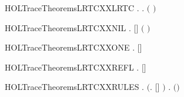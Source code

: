 \newcommand{\HOLTraceTheoremsLRTCXXINDUCT}{\UseVerbatim{HOLTraceTheoremsLRTCXXINDUCT}}
\begin{SaveVerbatim}{HOLTraceTheoremsLRTCXXLRTC}
\HOLTokenTurnstile{} \HOLSymConst{\HOLTokenForall{}}   .
            \HOLSymConst{\HOLTokenImp{}} \HOLSymConst{\HOLTokenForall{}} .      \HOLSymConst{\HOLTokenImp{}}    \ensuremath{(} \HOLSymConst{++} \ensuremath{)} 
\end{SaveVerbatim}
\newcommand{\HOLTraceTheoremsLRTCXXLRTC}{\UseVerbatim{HOLTraceTheoremsLRTCXXLRTC}}
\begin{SaveVerbatim}{HOLTraceTheoremsLRTCXXNIL}
\HOLTokenTurnstile{} \HOLSymConst{\HOLTokenForall{}}  .    \ensuremath{[}\ensuremath{]}  \HOLSymConst{\HOLTokenEquiv{}} \ensuremath{(} \HOLSymConst{\ensuremath{=}} \ensuremath{)}
\end{SaveVerbatim}
\newcommand{\HOLTraceTheoremsLRTCXXNIL}{\UseVerbatim{HOLTraceTheoremsLRTCXXNIL}}
\begin{SaveVerbatim}{HOLTraceTheoremsLRTCXXONE}
\HOLTokenTurnstile{} \HOLSymConst{\HOLTokenForall{}}   .    \ensuremath{[}\ensuremath{]}  \HOLSymConst{\HOLTokenEquiv{}}    
\end{SaveVerbatim}
\newcommand{\HOLTraceTheoremsLRTCXXONE}{\UseVerbatim{HOLTraceTheoremsLRTCXXONE}}
\begin{SaveVerbatim}{HOLTraceTheoremsLRTCXXREFL}
\HOLTokenTurnstile{} \HOLSymConst{\HOLTokenForall{}}.    \ensuremath{[}\ensuremath{]} 
\end{SaveVerbatim}
\newcommand{\HOLTraceTheoremsLRTCXXREFL}{\UseVerbatim{HOLTraceTheoremsLRTCXXREFL}}
\begin{SaveVerbatim}{HOLTraceTheoremsLRTCXXRULES}
\HOLTokenTurnstile{} \HOLSymConst{\HOLTokenForall{}}.
       \ensuremath{(}\HOLSymConst{\HOLTokenForall{}}.    \ensuremath{[}\ensuremath{]} \ensuremath{)} \HOLSymConst{\HOLTokenConj{}}
       \HOLSymConst{\HOLTokenForall{}}    .     \HOLSymConst{\HOLTokenConj{}}      \HOLSymConst{\HOLTokenImp{}}    \ensuremath{(}\HOLSymConst{::}\ensuremath{)} 
\end{SaveVerbatim}
